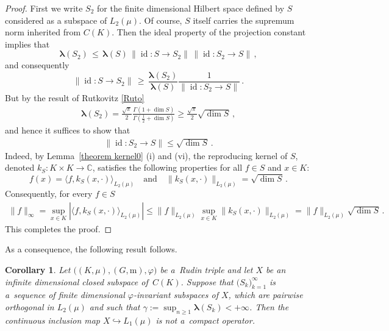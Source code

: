 \documentclass[12pt]{amsart}
\numberwithin{subsection}{section}
\newtheorem{corollary}[theorem]{Corollary}
\theoremstyle{definition}
\theoremstyle{remark}
\DeclareMathOperator{\id}{\mathrm{id}}
\begin{document}
\begin{proof}
First we write  $S_2 $ for the finite dimensional Hilbert space defined  by  $S $ considered as a subspace of  $L_2(\mu) $. Of course,
$S $ itself  carries the supremum norm inherited
from $C(K) $. Then the ideal property of the projection constant implies that
\[
\boldsymbol{\lambda}(S_2) \,\leq \,\boldsymbol{\lambda}(S)\, \|\id \colon S \to S_2\| \, \|\id: S_2 \to S\|\,,
\]
and consequently
\[
\|\id: S \to S_2\|
\,\geq \,
\frac{\boldsymbol{\lambda}(S_2) }{\boldsymbol{\lambda}(S) }
\frac{1}{\|\id: S_2 \to S\|}\,.
\]
But by the result of Rutkovitz \eqref{Ruto}
\begin{align*}
\boldsymbol{\lambda} (S_2)
= \frac{\sqrt{\pi}}{2}   \frac{\Gamma(1 + \dim S)}{\Gamma(\frac{1}{2} + \dim S)} \ge \frac{\sqrt{\pi}}{2} \sqrt{\dim S}\,,
\end{align*}
and hence it suffices to show that
\begin{align} \label{claimo}
\|\id \colon  S_2 \to S\| \leq  \sqrt{\dim S}\,.
\end{align}
Indeed, by Lemma~\ref{theorem kernel0} (i) and (vi), the reproducing kernel of $ S $, denoted $k_{S}\colon K \times K \to \mathbb{C}$,
satisfies the following properties for all $ f \in S $ and $ x \in K$:
\[
f(x) = \langle f, k_S(x, \cdot) \rangle_{L_2(\mu)} \quad \text{and} \quad \|k_S(x, \cdot)\|_{L_2(\mu)} = \sqrt{\dim S}\,.
\]
Consequently, for every  $f \in S $
\begin{align*}
\|f\|_\infty = \sup_{x \in K}| \langle f, k_S(x, \cdot) \rangle_{L_2(\mu)}|
\leq  \|f\|_{L_2(\mu)} \sup_{x \in K}\|k_S(x, \cdot)\|_{L_2(\mu)} =  \|f\|_{L_2(\mu)} \sqrt{\dim S}\,.
\end{align*}
This completes the proof.
\end{proof}

\smallskip


As a consequence, the following result follows.

\begin{corollary} \label{ryll compact}
Let $\big((K,\mu),(G,\mathrm{m}),\varphi\big) $ be a~Rudin triple and let  $X$ be an infinite dimensional closed subspace  of \,$C(K)$.
Suppose that $\big(S_k\big)_{k=1}^\infty $ is a~sequence  of finite dimensional $\varphi$-invariant subspaces of  $X $, which are
pairwise orthogonal in  $L_2(\mu) $ and such that  $\gamma:= \sup_{n\geq 1} \boldsymbol{\lambda}(S_k)<+ \infty $. Then the continuous inclusion map
$X \hookrightarrow L_1(\mu) $ is not a~compact operator.
\end{corollary}
\end{document}

